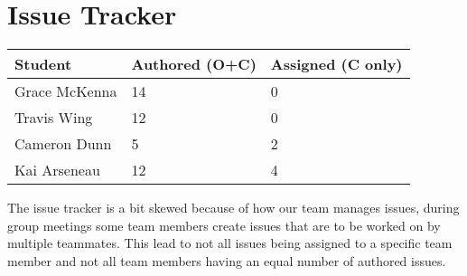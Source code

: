 \documentclass{article}
\begin{document}
\section{Issue Tracker}

\begin{table}[H]
\centering
\begin{tabular}{lll}
\toprule
\textbf{Student} & \textbf{Authored (O+C)} & \textbf{Assigned (C only)}\\
\midrule
Grace McKenna & 14 & 0 \\
Travis Wing & 12 & 0 \\
Cameron Dunn & 5 & 2 \\
Kai Arseneau & 12 & 4 \\
\bottomrule
\end{tabular}
\end{table}

The issue tracker is a bit skewed because of how our team manages issues, during group meetings some team members create issues that are to be worked on by multiple teammates.
This lead to not all issues being assigned to a specific team member and not all team members having an equal number of authored issues.
\end{document}
